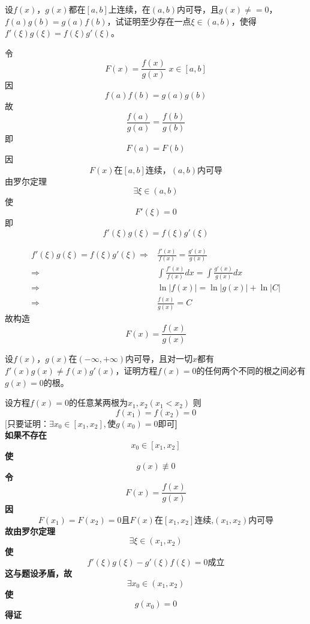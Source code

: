 \begin{example}
	设$f(x)$，$g(x)$都在$[a,b]$上连续，在$(a,b)$内可导，且$g(x)\neq=0$，$f(a)g(b)=g(a)f(b)$，试证明至少存在一点$\xi\in(a,b)$，使得$f'(\xi)g(\xi)=f(\xi)g'(\xi)$。
\end{example}
	\begin{newproof}
		令\[F\left( x \right) =\frac{f\left( x \right)}{g\left( x \right)}\,\, x\in \left[ a,b \right] \]
		因\[f\left( a \right) f\left( b \right) =g\left( a \right) g\left( b \right) \]
		故\[\frac{f\left( a \right)}{g\left( a \right)}=\frac{f\left( b \right)}{g\left( b \right)}\]
		即\[F\left( a \right) =F\left( b \right) \]
		因\[F\left( x \right) \text{在}\left[ a,b \right] \text{连续，}\left( a,b \right) \text{内可导}\]
		由罗尔定理\[\exists \xi \in \left( a,b \right) \]
		使\[F'\left( \xi \right) =0\]
		即\[f'\left( \xi \right) g\left( \xi \right) =f\left( \xi \right) g'\left( \xi \right) \]
	\end{newproof}
	\begin{note}
		\begin{align*}
			f'\left( \xi \right) g\left( \xi \right) =f\left( \xi \right) g'\left( \xi \right)
			\Longrightarrow {}&
			\frac{f'\left( x \right)}{f\left( x \right)}=\frac{g'\left( x \right)}{g\left( x \right)}\\
			\Longrightarrow {}&
			\int{\frac{f'\left( x \right)}{f\left( x \right)}}dx=\int{\frac{g'\left( x \right)}{g\left( x \right)}dx}\\
			\Longrightarrow {}&
			\ln \left| f\left( x \right) \right|=\ln \left| g\left( x \right) \right|+\ln\text{|}C|\\
			\Longrightarrow {}&
			\frac{f\left( x \right)}{g\left( x \right)}=C
		\end{align*}
		故构造\[F\left( x \right) =\frac{f\left( x \right)}{g\left( x \right)}\]
	\end{note}
\begin{example}
	设$f(x)$，$g(x)$在$(-\infty,+\infty)$内可导，且对一切$x$都有$f'(x)g(x)\neq f(x)g'(x)$，证明方程$f(x)=0$的任何两个不同的根之间必有$g(x)=0$的根。
\end{example}
	\begin{newproof}
		设方程$f(x) = 0$的任意某两根为$x_1,x_2\left( x_1<x_2 \right) $
		则\[f\left( x_1 \right) =f\left( x_2 \right) =0\]
		[\bf $\text{只要证明：}\exists x_0\in \left[ x_1,x_2 \right] ,\text{使}g\left( x_0 \right) =\text{0即可}$]\\
		如果不存在\[x_0\in \left[ x_1,x_2 \right] \]
		使\[g\left( x \right) \not \equiv 0\]
		令\[F\left( x \right) =\frac{f\left( x \right)}{g\left( x \right)}\]
		因\[F\left( x_1 \right) =F\left( x_2 \right) =\text{0且}F\left( x \right) \text{在}\left[ x_1,x_2 \right] \text{连续,}\left( x_1,x_2 \right) \text{内可导}\]
		故由罗尔定理\[\exists \xi \in \left( x_1,x_2 \right) \]
		使\[f'\left( \xi \right) g\left( \xi \right) -g'\left( \xi \right) f\left( \xi \right) =\text{0成立}\]
		这与题设矛盾，故\[\exists x_0\in \left( x_1,x_2 \right) \]
		使\[g\left( x_0 \right) =0\]
		得证
	\end{newproof}
